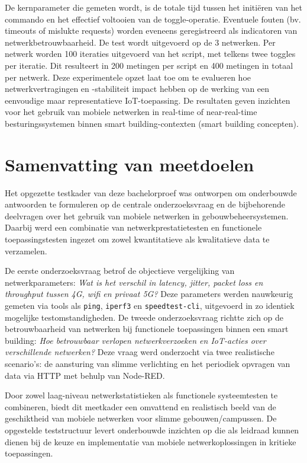De kernparameter die gemeten wordt, is de totale tijd tussen het initiëren van het commando en het effectief voltooien van de toggle-operatie. Eventuele fouten (bv. timeouts of mislukte requests) worden eveneens geregistreerd als indicatoren van netwerkbetrouwbaarheid.
De test wordt uitgevoerd op de 3 netwerken. Per netwerk worden 100 iteraties uitgevoerd van het script, met telkens twee toggles per iteratie. Dit resulteert in 200 metingen per script en 400 metingen in totaal per netwerk.
Deze experimentele opzet laat toe om te evalueren hoe netwerkvertragingen en -stabiliteit impact hebben op de werking van een eenvoudige maar representatieve IoT-toepassing. De resultaten geven inzichten voor het gebruik van mobiele netwerken in real-time of near-real-time besturingssystemen binnen smart building-contexten (smart building concepten).

\section{Samenvatting van meetdoelen}

Het opgezette testkader van deze bachelorproef was ontworpen om onderbouwde antwoorden te formuleren op de centrale onderzoeksvraag en de bijbehorende deelvragen over het gebruik van mobiele netwerken in gebouwbeheersystemen. Daarbij werd een combinatie van netwerkprestatietesten en functionele toepassingstesten ingezet om zowel kwantitatieve als kwalitatieve data te verzamelen.

De eerste onderzoeksvraag betrof de objectieve vergelijking van netwerkparameters: \textit{Wat is het verschil in latency, jitter, packet loss en throughput tussen 4G, wifi en privaat 5G?} Deze parameters werden nauwkeurig gemeten via tools als \texttt{ping}, \texttt{iperf3} en \texttt{speedtest-cli}, uitgevoerd in zo identiek mogelijke testomstandigheden. De tweede onderzoeksvraag richtte zich op de betrouwbaarheid van netwerken bij functionele toepassingen binnen een smart building: \textit{Hoe betrouwbaar verlopen netwerkverzoeken en IoT-acties over verschillende netwerken?} Deze vraag werd onderzocht via twee realistische scenario’s: de aansturing van slimme verlichting en het periodiek opvragen van data via HTTP met behulp van Node-RED.

Door zowel laag-niveau netwerkstatistieken als functionele systeemtesten te combineren, biedt dit meetkader een omvattend en realistisch beeld van de geschiktheid van mobiele netwerken voor slimme gebouwen/campussen. De opgestelde teststructuur levert onderbouwde inzichten op die als leidraad kunnen dienen bij de keuze en implementatie van mobiele netwerkoplossingen in kritieke toepassingen.

